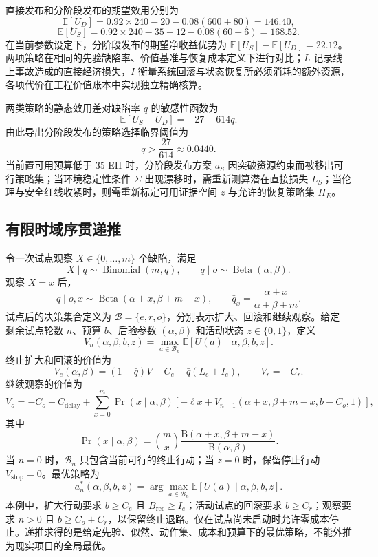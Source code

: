 \documentclass[11pt,a4paper]{ctexart}
\numberwithin{equation}{section}
\theoremstyle{definition}
\theoremstyle{plain}
\begin{document}
直接发布和分阶段发布的期望效用分别为
\[
\mathbb E[U_D]=0.92\times240-20-0.08(600+80)=146.40,
\]
\[
\mathbb E[U_S]=0.92\times240-35-12-0.08(60+6)=168.52.
\]
在当前参数设定下，分阶段发布的期望净收益优势为 $\mathbb E[U_S]-\mathbb E[U_D]=22.12$。两项策略在相同的先验缺陷率、价值基准与恢复成本定义下进行对比；$L$ 记录线上事故造成的直接经济损失，$I$ 衡量系统回滚与状态恢复所必须消耗的额外资源，各项代价在工程价值账本中实现独立精确核算。

两类策略的静态效用差对缺陷率 $q$ 的敏感性函数为
\[
\mathbb E[U_S-U_D]=-27+614q.
\]
由此导出分阶段发布的策略选择临界阈值为
\[
q>\frac{27}{614}\approx0.0440.
\]
当前置可用预算低于 35 EH 时，分阶段发布方案 $a_S$ 因突破资源约束而被移出可行策略集；当环境稳定性条件 $\Sigma$ 出现漂移时，需重新测算潜在直接损失 $L_S$；当伦理与安全红线收紧时，则需重新标定可用证据空间 $z$ 与允许的恢复策略集 $\Pi_E$。

\subsection{有限时域序贯递推}

令一次试点观察 $X\in\{0,\ldots,m\}$ 个缺陷，满足
\[
X\mid q\sim\operatorname{Binomial}(m,q),
\qquad
q\mid o\sim\operatorname{Beta}(\alpha,\beta).
\]
观察 $X=x$ 后，
\[
q\mid o,x\sim\operatorname{Beta}(\alpha+x,\beta+m-x),
\qquad
\bar q_x=\frac{\alpha+x}{\alpha+\beta+m}.
\]
试点后的决策集合定义为 $\mathcal B=\{e,r,o\}$，分别表示扩大、回滚和继续观察。给定
剩余试点轮数 $n$、预算 $b$、后验参数 $(\alpha,\beta)$ 和活动状态 $z\in\{0,1\}$，定义
\begin{equation}
V_n(\alpha,\beta,b,z)=
\max_{a\in\mathcal B_n}
\mathbb E[U(a)\mid\alpha,\beta,b,z].
\label{eq:sequential-value}
\end{equation}
终止扩大和回滚的价值为
\begin{equation}
V_e(\alpha,\beta)=
(1-\bar q)V-C_e-\bar q(L_e+I_e),
\qquad
V_r=-C_r.
\label{eq:terminal-actions}
\end{equation}
继续观察的价值为
\begin{equation}
V_o=
-C_o-C_{\mathrm{delay}}
+\sum_{x=0}^{m}
\Pr(x\mid\alpha,\beta)
\left[
-\ell x+
V_{n-1}(\alpha+x,\beta+m-x,b-C_o,1)
\right],
\label{eq:observe-action}
\end{equation}
其中
\begin{equation}
\Pr(x\mid\alpha,\beta)
=
\binom{m}{x}
\frac{\mathrm B(\alpha+x,\beta+m-x)}
{\mathrm B(\alpha,\beta)}.
\label{eq:beta-binomial}
\end{equation}
当 $n=0$ 时，$\mathcal B_n$ 只包含当前可行的终止行动；当 $z=0$ 时，保留停止行动
$V_{\mathrm{stop}}=0$。最优策略为
\[
a_n^*(\alpha,\beta,b,z)=
\arg\max_{a\in\mathcal B_n}
\mathbb E[U(a)\mid\alpha,\beta,b,z].
\]
本例中，扩大行动要求 $b\ge C_e$ 且 $B_{\mathrm{rec}}\ge I_e$；活动试点的回滚要求 $b\ge C_r$；观察要求 $n>0$ 且 $b\ge C_o+C_r$，以保留终止退路。仅在试点尚未启动时允许零成本停止。递推求得的是给定先验、似然、动作集、成本和预算下的最优策略，不能外推为现实项目的全局最优。
\end{document}
